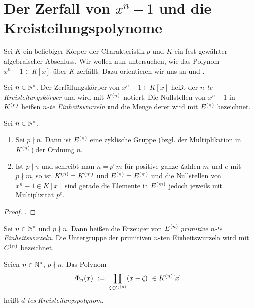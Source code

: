 \chapter{Der Zerfall von $x^n-1$ und die Kreisteilungspolynome}
\label{chap:kreisteilungspolynome}

Sei $K$ ein beliebiger Körper der Charakteristik $p$ 
und $\bar K$ ein fest gewählter algebraischer
Abschluss. Wir wollen nun untersuchen, wie das Polynom
$x^n-1 \in K[x]$ über $K$ zerfällt. Dazu orientieren wir uns 
an \autocite{lidl1997finite} und \autocite{wan2003lectures}.

\begin{definition}
  Sei $n\in\mathbb{N}^\ast$. Der Zerfällungskörper von $x^n-1 \in K[x]$ heißt
  der \emph{$n$-te Kreisteilungskörper} und wird mit $K^{(n)}$ notiert.
  Die Nullstellen von $x^n-1$ in $K^{(n)}$ heißen \emph{$n$-te
  Einheitswurzeln} und die Menge derer wird mit $E^{(n)}$ bezeichnet.
\end{definition}


\begin{satz}
  Sei $n\in \mathbb{N}^\ast$.
  \begin{enumerate}
    \item Sei $p\nmid n$. Dann ist $E^{(n)}$ eine zyklische Gruppe (bzgl. der
      Multiplikation in $K^{(n)}$) der Ordnung $n$.
    \item Ist $p \mid n$ und schreibt man $n = p^e m$ 
      für positive ganze Zahlen $m$ und $e$ mit $p\nmid m$, so
      ist $K^{(n)} = K^{(m)}$ und $E^{(n)}= E^{(m)}$ und die Nullstellen von
      $x^n-1 \in K[x]$ sind gerade die Elemente in $E^{(m)}$ jedoch jeweils mit
      Multiplizität $p^e$.
  \end{enumerate}
\end{satz}
\begin{proof}
  \autocite[Theorem 2.42]{lidl1997finite}.
\end{proof}


\begin{definition}
  Sei $n\in \mathbb{N}^\ast$ und $p\nmid n$. Dann heißen die Erzeuger von 
  $E^{(n)}$ \emph{primitive $n$-te Einheitswurzeln}. 
  Die Untergruppe der primitiven $n$-ten Einheitswurzeln wird mit
  $C^{(n)}$ bezeichnet.
\end{definition}


\begin{definition}[Kreisteilungspolynom]
  Seien $n \in \mathbb{N}^\ast$, $p\nmid n$. Das Polynom 
  \[ \Phi_n(x) \ :=\  \prod_{\zeta \in C^{(n)}} (x - \zeta)\ \in 
    K^{(n)}[x]\]
  heißt \emph{$d$-tes Kreisteilungspolynom}.
\end{definition}


